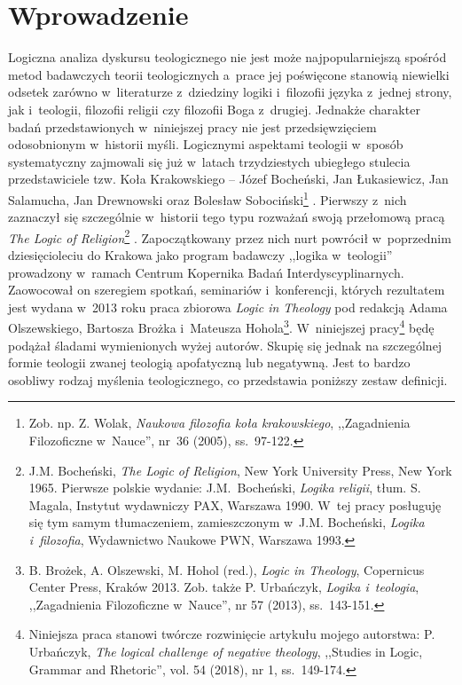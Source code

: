 \chapter{Wprowadzenie}

Logiczna analiza dyskursu teologicznego nie jest może najpopularniejszą spośród metod badawczych teorii teologicznych a~prace jej poświęcone stanowią niewielki odsetek zarówno w~literaturze z~dziedziny logiki i~filozofii języka z~jednej strony, jak i~teologii, filozofii religii czy filozofii Boga z~drugiej. Jednakże charakter badań przedstawionych w~niniejszej pracy nie jest przedsięwzięciem odosobnionym w~historii myśli. Logicznymi aspektami teologii w~sposób systematyczny zajmowali się już w~latach trzydziestych ubiegłego stulecia przedstawiciele tzw. Koła Krakowskiego -- Józef Bocheński, Jan Łukasiewicz, Jan Salamucha, Jan Drewnowski oraz Bolesław Sobociński\footnote{Zob. np. Z. Wolak, \textit{Naukowa filozofia koła krakowskiego}, ,,Zagadnienia Filozoficzne w~Nauce'', nr~36 (2005), ss.~97-122.} . Pierwszy z~nich zaznaczył się szczególnie w~historii tego typu rozważań swoją przełomową pracą \textit{The Logic of Religion}\footnote{J.M. Bocheński, \textit{The Logic of Religion}, New York University Press, New York 1965. Pierwsze polskie wydanie: J.M.~Bocheński, \textit{Logika religii}, tłum. S. Magala, Instytut wydawniczy PAX, Warszawa 1990. W~tej pracy posługuję się tym samym tłumaczeniem, zamieszczonym w~J.M. Bocheński, \textit{Logika i~filozofia}, Wydawnictwo Naukowe PWN, Warszawa 1993.} . Zapoczątkowany przez nich nurt powrócił w~poprzednim dziesięcioleciu do Krakowa jako program badawczy ,,logika w~teologii'' prowadzony w~ramach Centrum Kopernika Badań Interdyscyplinarnych. Zaowocował on szeregiem spotkań, seminariów i~konferencji, których rezultatem jest wydana w~2013 roku praca zbiorowa \textit{Logic in Theology} pod redakcją Adama Olszewskiego, Bartosza Brożka i~Mateusza Hohola\footnote{B. Brożek, A. Olszewski, M. Hohol (red.), \textit{Logic in Theology}, Copernicus Center Press, Kraków 2013. Zob. także P. Urbańczyk, \textit{Logika i~teologia}, ,,Zagadnienia Filozoficzne w~Nauce'', nr 57 (2013), ss.~143-151.}. W~niniejszej pracy\footnote{Niniejsza praca stanowi twórcze rozwinięcie artykułu mojego autorstwa: P. Urbańczyk, \textit{The logical challenge of negative theology}, ,,Studies in Logic, Grammar and Rhetoric'', vol. 54 (2018), nr 1, ss.~149-174.} będę podążał śladami wymienionych wyżej autorów. Skupię się jednak na szczególnej formie teologii zwanej teologią apofatyczną lub negatywną. Jest to bardzo osobliwy rodzaj myślenia teologicznego, co przedstawia poniższy zestaw definicji.


